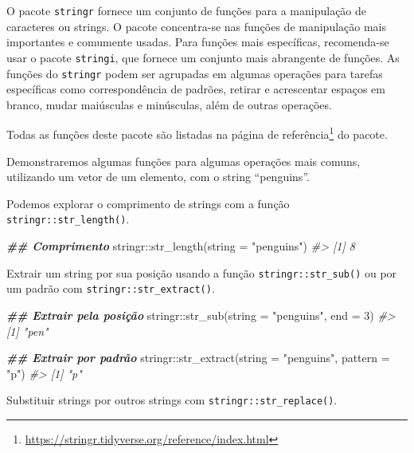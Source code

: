 \documentclass[
]{book}
\newenvironment{Shaded}{\begin{snugshade}}{\end{snugshade}}
\newcommand{\AttributeTok}[1]{\textcolor[rgb]{0.61,0.61,0.61}{#1}}
\newcommand{\CommentTok}[1]{\textcolor[rgb]{0.37,0.37,0.37}{\textit{#1}}}
\newcommand{\DecValTok}[1]{\textcolor[rgb]{0.06,0.06,0.06}{#1}}
\newcommand{\DocumentationTok}[1]{\textcolor[rgb]{0.37,0.37,0.37}{\textbf{\textit{#1}}}}
\newcommand{\FunctionTok}[1]{\textcolor[rgb]{0,0,0}{#1}}
\newcommand{\NormalTok}[1]{#1}
\newcommand{\SpecialCharTok}[1]{\textcolor[rgb]{0,0,0}{#1}}
\newcommand{\StringTok}[1]{\textcolor[rgb]{0.5,0.5,0.5}{#1}}
\renewcommand{\href}[2]{#2\footnote{\url{#1}}}
\begin{document}
O pacote \texttt{stringr} fornece um conjunto de funções para a manipulação de caracteres ou strings. O pacote concentra-se nas funções de manipulação mais importantes e comumente usadas. Para funções mais específicas, recomenda-se usar o pacote \texttt{stringi}, que fornece um conjunto mais abrangente de funções. As funções do \texttt{stringr} podem ser agrupadas em algumas operações para tarefas específicas como correspondência de padrões, retirar e acrescentar espaços em branco, mudar maiúsculas e minúsculas, além de outras operações.

Todas as funções deste pacote são listadas na \href{https://stringr.tidyverse.org/reference/index.html}{página de referência} do pacote.

Demonstraremos algumas funções para algumas operações mais comuns, utilizando um vetor de um elemento, com o string ``penguins''.

Podemos explorar o comprimento de strings com a função \texttt{stringr::str\_length()}.

\begin{Shaded}
\begin{Highlighting}[]
\DocumentationTok{\#\# Comprimento}
\NormalTok{stringr}\SpecialCharTok{::}\FunctionTok{str\_length}\NormalTok{(}\AttributeTok{string =} \StringTok{"penguins"}\NormalTok{)}
\CommentTok{\#\textgreater{} [1] 8}
\end{Highlighting}
\end{Shaded}

Extrair um string por sua posição usando a função \texttt{stringr::str\_sub()} ou por um padrão com \texttt{stringr::str\_extract()}.

\begin{Shaded}
\begin{Highlighting}[]
\DocumentationTok{\#\# Extrair pela posição}
\NormalTok{stringr}\SpecialCharTok{::}\FunctionTok{str\_sub}\NormalTok{(}\AttributeTok{string =} \StringTok{"penguins"}\NormalTok{, }\AttributeTok{end =} \DecValTok{3}\NormalTok{)}
\CommentTok{\#\textgreater{} [1] "pen"}

\DocumentationTok{\#\# Extrair por padrão}
\NormalTok{stringr}\SpecialCharTok{::}\FunctionTok{str\_extract}\NormalTok{(}\AttributeTok{string =} \StringTok{"penguins"}\NormalTok{, }\AttributeTok{pattern =} \StringTok{"p"}\NormalTok{)}
\CommentTok{\#\textgreater{} [1] "p"}
\end{Highlighting}
\end{Shaded}

Substituir strings por outros strings com \texttt{stringr::str\_replace()}.
\end{document}
